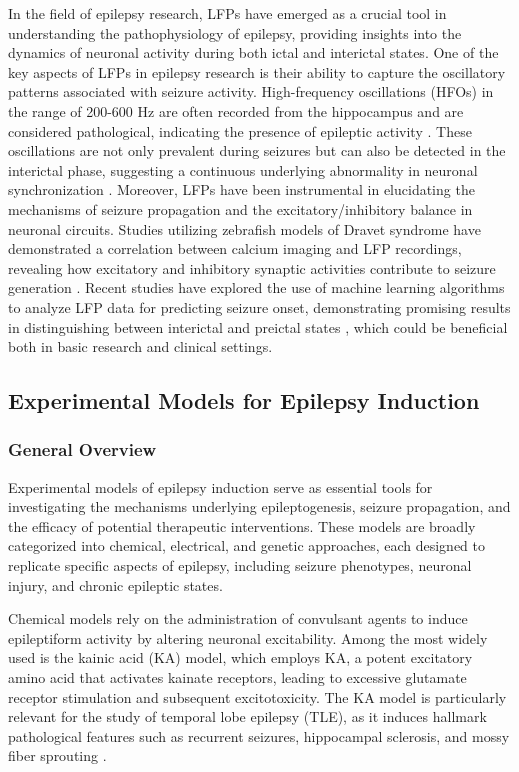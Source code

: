 \documentclass{article}
\begin{document}
In the field of epilepsy research, LFPs have emerged as a crucial tool in understanding the pathophysiology of epilepsy, providing insights into the dynamics of neuronal activity during both ictal and interictal states. One of the key aspects of LFPs in epilepsy research is their ability to capture the oscillatory patterns associated with seizure activity. High-frequency oscillations (HFOs) in the range of 200-600 Hz are often recorded from the hippocampus and are considered pathological, indicating the presence of epileptic activity \cite{molnar2023, rolston2010}. These oscillations are not only prevalent during seizures but can also be detected in the interictal phase, suggesting a continuous underlying abnormality in neuronal synchronization \cite{satzer2023}. Moreover, LFPs have been instrumental in elucidating the mechanisms of seizure propagation and the excitatory/inhibitory balance in neuronal circuits. Studies utilizing zebrafish models of Dravet syndrome have demonstrated a correlation between calcium imaging and LFP recordings, revealing how excitatory and inhibitory synaptic activities contribute to seizure generation \cite{brenet2019, cozzolino2020}. Recent studies have explored the use of machine learning algorithms to analyze LFP data for predicting seizure onset, demonstrating promising results in distinguishing between interictal and preictal states \cite{aghagolzadeh2016, budde2022}, which could be beneficial both in basic research and clinical settings.

\subsection{Experimental Models for Epilepsy Induction}
\subsubsection{General Overview}

Experimental models of epilepsy induction serve as essential tools for investigating the mechanisms underlying epileptogenesis, seizure propagation, and the efficacy of potential therapeutic interventions. These models are broadly categorized into chemical, electrical, and genetic approaches, each designed to replicate specific aspects of epilepsy, including seizure phenotypes, neuronal injury, and chronic epileptic states.

Chemical models rely on the administration of convulsant agents to induce epileptiform activity by altering neuronal excitability. Among the most widely used is the kainic acid (KA) model, which employs KA, a potent excitatory amino acid that activates kainate receptors, leading to excessive glutamate receptor stimulation and subsequent excitotoxicity. The KA model is particularly relevant for the study of temporal lobe epilepsy (TLE), as it induces hallmark pathological features such as recurrent seizures, hippocampal sclerosis, and mossy fiber sprouting \cite{rubio2024}.
\end{document}

